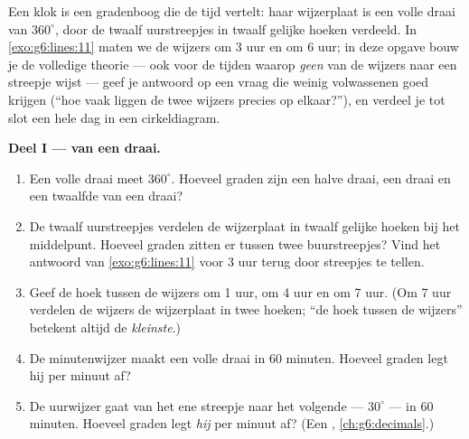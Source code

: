 \begin{problem}
\label{pb:g6:lines:1}
Een klok is een gradenboog die de tijd vertelt: haar wijzerplaat is een volle
draai van $360^\circ$, door de twaalf uurstreepjes in twaalf gelijke hoeken
verdeeld. In \cref{exo:g6:lines:11} maten we de wijzers om 3 uur en om 6 uur;
in deze opgave bouw je de volledige theorie --- ook voor de tijden waarop
\emph{geen} van de wijzers naar een streepje wijst --- geef je antwoord op een
vraag die weinig volwassenen goed krijgen (``hoe vaak liggen de twee wijzers
precies op elkaar?''), en verdeel je tot slot een hele dag in een
cirkeldiagram.

\medskip
\noindent\textbf{Deel I ---  van een draai.}
\begin{enumerate}
  \item Een volle draai meet $360^\circ$. Hoeveel graden zijn een halve draai,
        een  draai en een twaalfde van een draai?
  \item De twaalf uurstreepjes verdelen de wijzerplaat in twaalf gelijke
        hoeken bij het middelpunt. Hoeveel graden zitten er tussen twee
        buurstreepjes? Vind het antwoord van \cref{exo:g6:lines:11} voor 3 uur
        terug door streepjes te tellen.
  \item Geef de hoek tussen de wijzers om 1 uur, om 4 uur en om 7 uur. (Om 7
        uur verdelen de wijzers de wijzerplaat in twee hoeken; ``de hoek
        tussen de wijzers'' betekent altijd de \emph{kleinste}.)
  \item De minutenwijzer maakt een volle draai in $60$ minuten. Hoeveel graden
        legt hij per minuut af?
  \item De uurwijzer gaat van het ene streepje naar het volgende ---
        $30^\circ$ --- in $60$ minuten. Hoeveel graden legt \emph{hij} per
        minuut af? (Een , \cref{ch:g6:decimals}.)
\end{enumerate}


\end{problem}
